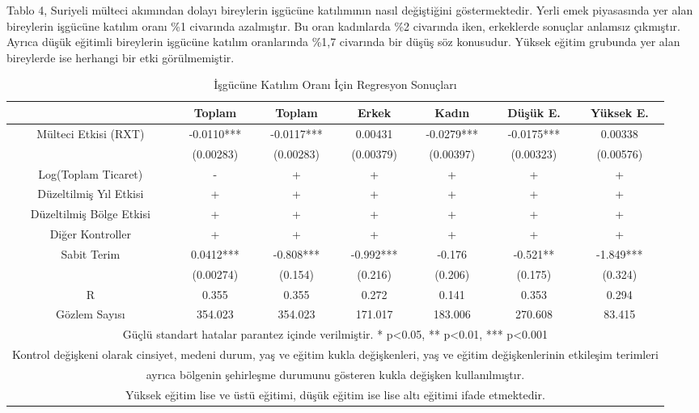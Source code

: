 \documentclass{article}
\begin{document}
\begin{justify}
        Tablo 4, Suriyeli mülteci akımından dolayı bireylerin işgücüne katılımının nasıl değiştiğini
        göstermektedir. Yerli emek piyasasında yer alan bireylerin işgücüne katılım oranı \%1 civarında 
        azalmıştır. Bu oran kadınlarda \%2 civarında iken, erkeklerde sonuçlar anlamsız çıkmıştır. 
        Ayrıca düşük eğitimli bireylerin işgücüne katılım oranlarında \%1,7 civarında bir düşüş söz konusudur.
        Yüksek eğitim grubunda yer alan bireylerde ise herhangi bir etki görülmemiştir.


        \FloatBarrier
        \begin{table}[h]
            \centering
            \caption{İşgücüne Katılım Oranı İçin Regresyon Sonuçları}
            \begin{tabular}{|ccccccc|}
                \hline
                     & Toplam & Toplam & Erkek & Kadın & Düşük E. & Yüksek E. \\ \hline
                     Mülteci Etkisi (RXT) & -0.0110*** & -0.0117*** & 0.00431 & -0.0279*** & -0.0175*** & 0.00338    \\ 
                     & (0.00283) & (0.00283) & (0.00379) & (0.00397) & (0.00323) & (0.00576)    \\ 
                     Log(Toplam Ticaret) & - & + & + & + & + & + \\ 
                    Düzeltilmiş Yıl Etkisi & + & + & + & + & + & + \\ 
                    Düzeltilmiş Bölge Etkisi & + & + & + & + & + & + \\ 
                    Diğer Kontroller & + & + & + & + & + & + \\
                    Sabit Terim & 0.0412*** & -0.808*** & -0.992*** & -0.176 & -0.521** & -1.849*** \\ 
                    & (0.00274) & (0.154) & (0.216) & (0.206) & (0.175) & (0.324)    \\ 
                    R & 0.355 & 0.355 & 0.272 & 0.141 & 0.353 & 0.294    \\ 
                    Gözlem Sayısı & 354.023 & 354.023 & 171.017 & 183.006 & 270.608 & 83.415 \\ \hline
                    \multicolumn{7}{|c|}{\scriptsize Güçlü standart hatalar parantez içinde verilmiştir.   * p<0.05, ** p<0.01, *** p<0.001}\\ \hline
                    \multicolumn{7}{|c|}{\scriptsize Kontrol değişkeni olarak cinsiyet, medeni durum, yaş ve eğitim kukla değişkenleri, yaş ve eğitim değişkenlerinin etkileşim terimleri} \\ 
                    \multicolumn{7}{|c|}{\scriptsize ayrıca bölgenin şehirleşme durumunu gösteren kukla değişken kullanılmıştır.} \\ \hline
                    \multicolumn{7}{|c|}{\scriptsize Yüksek eğitim lise ve üstü eğitimi, düşük eğitim ise lise altı eğitimi ifade etmektedir.} \\ \hline


\end{tabular}
\end{table}
\end{justify}
\end{document}
